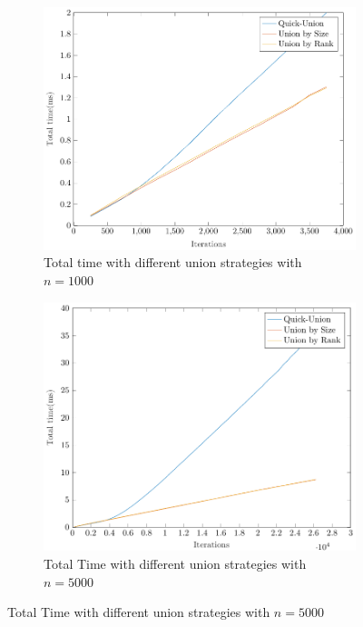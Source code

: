 \begin{figure}[ht]
    \centering
    \begin{subfigure}{0.32\textwidth}
        \centering
        \includegraphics[width=\textwidth]{../images/plotNCFull1000_time(ms).pdf}
        \caption{Total time with different union strategies with $n = 1000$}
    \end{subfigure}%
    \hfill
    \begin{subfigure}{0.32\textwidth}
        \centering
        \includegraphics[width=\textwidth]{../images/plotNCFull5000_time(ms).pdf}
        \caption{Total Time with different union strategies with $n = 5000$}

\end{subfigure}
\end{figure}
